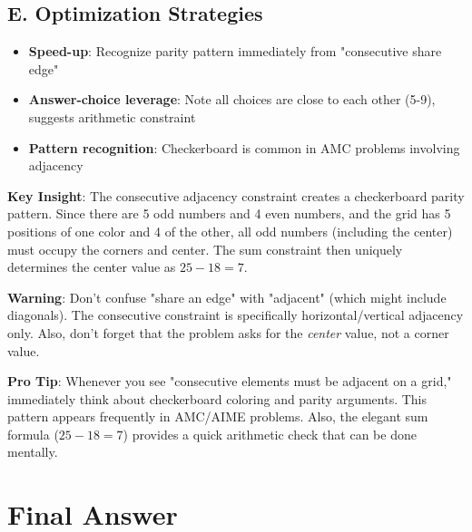 \documentclass[11pt]{article}
\begin{document}
\begin{competitionbox}
\subsection*{E. Optimization Strategies}
\begin{itemize}[leftmargin=*]
    \item \textbf{Speed-up}: Recognize parity pattern immediately from "consecutive share edge"
    \item \textbf{Answer-choice leverage}: Note all choices are close to each other (5-9), suggests arithmetic constraint
    \item \textbf{Pattern recognition}: Checkerboard is common in AMC problems involving adjacency
\end{itemize}
\end{competitionbox}

\begin{keyinsightbox}
\textbf{Key Insight}: The consecutive adjacency constraint creates a checkerboard parity pattern. Since there are 5 odd numbers and 4 even numbers, and the grid has 5 positions of one color and 4 of the other, all odd numbers (including the center) must occupy the corners and center. The sum constraint then uniquely determines the center value as $25-18=7$.
\end{keyinsightbox}

\begin{warningbox}
\textbf{Warning}: Don't confuse "share an edge" with "adjacent" (which might include diagonals). The consecutive constraint is specifically horizontal/vertical adjacency only. Also, don't forget that the problem asks for the \textit{center} value, not a corner value.
\end{warningbox}

\begin{tipbox}
\textbf{Pro Tip}: Whenever you see "consecutive elements must be adjacent on a grid," immediately think about checkerboard coloring and parity arguments. This pattern appears frequently in AMC/AIME problems. Also, the elegant sum formula ($25-18=7$) provides a quick arithmetic check that can be done mentally.
\end{tipbox}

\section*{Final Answer}
\end{document}
